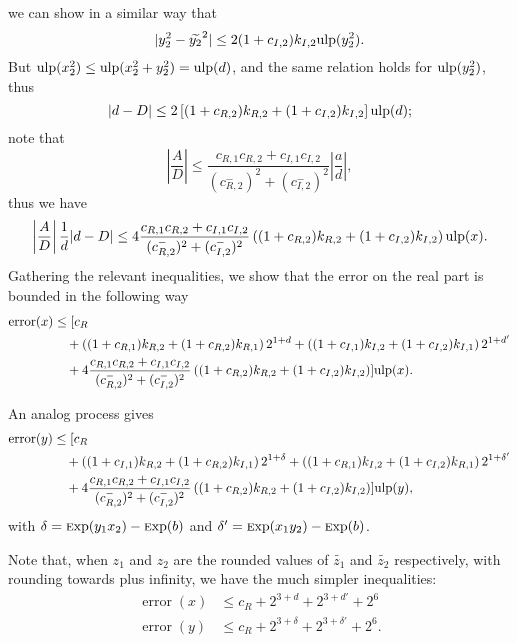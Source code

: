 \documentclass {article}
\DeclareMathOperator{\error}{error}
\newcommand {\Ulp}{{\rm ulp}}
\newcommand {\Exp}{{\rm \textsc exp}}
\begin{document}
we can show in a similar way that
\[
|y_2^2-\widetilde{y_2}^2| \leq 2(1+c_{I,2})k_{I,2}\Ulp(y_2^2).
\]
But $\Ulp(x_2^2) \leq \Ulp(x_2^2+y_2^2) = \Ulp(d)$, and the same relation
holds for $\Ulp(y_2^2)$, thus
\[
|d-D| \leq 2\left[(1+c_{R,2})k_{R,2}+(1+c_{I,2})k_{I,2}\right]\Ulp(d);
\]
note that
\[
\left|\frac{A}{D}\right| \leq
\frac{c_{R,1}c_{R,2}+c_{I,1}c_{I,2}}{(c_{R,2}^-)^2+(c_{I,2}^-)^2}
\left|\frac{a}{d}\right|,
\]
thus we have
\[
\left|\frac{A}{D}\right|\frac{1}{d}|d-D| \leq
4\frac{c_{R,1}c_{R,2}+c_{I,1}c_{I,2}}{(c_{R,2}^-)^2+(c_{I,2}^-)^2}
\left((1+c_{R,2})k_{R,2}+(1+c_{I,2})k_{I,2}\right)\Ulp(x).
\]
Gathering the relevant inequalities, we show that the error on the real part
is bounded in the following way
\begin{equation*}
  \begin{split}
    \error(x) &\leq [c_R\\
    &\quad+\left((1+c_{R,1})k_{R,2}+(1+c_{R,2})k_{R,1}\right)2^{1+d}
    +\left((1+c_{I,1})k_{I,2}+(1+c_{I,2})k_{I,1}\right)2^{1+d'}\\
    &\quad+4\frac{c_{R,1}c_{R,2}+c_{I,1}c_{I,2}}{(c_{R,2}^-)^2+(c_{I,2}^-)^2}
    \left((1+c_{R,2})k_{R,2}+(1+c_{I,2})k_{I,2}\right)]
    \Ulp(x).
  \end{split}
\end{equation*}

An analog process gives
\begin{equation*}
  \begin{split}
    \error(y) &\leq [c_R\\
    &\quad+\left((1+c_{I,1})k_{R,2}+(1+c_{R,2})k_{I,1}\right)2^{1+\delta}
    +\left((1+c_{R,1})k_{I,2}+(1+c_{I,2})k_{R,1}\right)2^{1+\delta'}\\
    &\quad+4\frac{c_{R,1}c_{R,2}+c_{I,1}c_{I,2}}{(c_{R,2}^-)^2+(c_{I,2}^-)^2}
    \left((1+c_{R,2})k_{R,2}+(1+c_{I,2})k_{I,2}\right)]
    \Ulp(y),
  \end{split}
\end{equation*}
with $\delta=\Exp(y_1x_2)-\Exp(b)$ and $\delta'=\Exp(x_1y_2)-\Exp(b)$.

Note that, when $z_1$ and $z_2$ are the rounded values of $\widetilde{z_1}$
and $\widetilde{z_2}$ respectively, with rounding towards plus infinity, we
have the much simpler inequalities:
\begin{align*}
\error(x) &\leq c_R + 2^{3+d} + 2^{3+d'} + 2^6\\
\error(y) &\leq c_R + 2^{3+\delta} + 2^{3+\delta'} + 2^6.
\end{align*}
\end{document}
